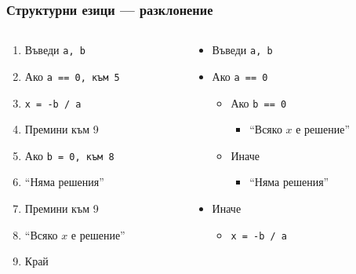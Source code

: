 \documentclass{beamer}
\begin{document}
\begin{frame}
  \frametitle{Структурни езици — разклонение}

  \begin{columns}
    \begin{column}{.5\textwidth}
      \begin{enumerate}
      \item Въведи \tt a, \tt b
      \item Ако \tt{a == 0}, към 5
      \item \tt{x = -b / a}
      \item Премини към 9
      \item Ако \tt{b = 0}, към 8
      \item ``Няма решения''
      \item Премини към 9
      \item ``Всяко $x$ е решение''
      \item Край
      \end{enumerate}
    \end{column}
    \begin{column}{.5\textwidth}
      \begin{itemize}
      \item Въведи \tt a, \tt b
      \item Ако \tt{a == 0}
        \begin{itemize}
        \item Ако \tt{b == 0}
          \begin{itemize}
          \item ``Всяко $x$ е решение''
          \end{itemize}
        \item Иначе
          \begin{itemize}
          \item ``Няма решения''
          \end{itemize}
        \end{itemize}
      \item Иначе
        \begin{itemize}
        \item \tt{x = -b / a}
        \end{itemize}
      \end{itemize}
    \end{column}
  \end{columns}
\end{frame}
\end{document}
